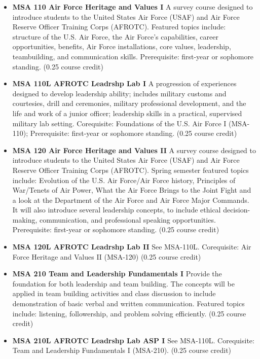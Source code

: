 \documentclass[
  letterpaper,
]{scrbook}
\providecommand{\tightlist}{%
  \setlength{\itemsep}{0pt}\setlength{\parskip}{0pt}}
\begin{document}
\begin{itemize}
\tightlist
\item
  \textbf{MSA 110 Air Force Heritage and Values I} A survey course
  designed to introduce students to the United States Air Force (USAF)
  and Air Force Reserve Officer Training Corps (AFROTC). Featured topics
  include: structure of the U.S. Air Force, the Air Force's
  capabilities, career opportunities, benefits, Air Force installations,
  core values, leadership, teambuilding, and communication skills.
  Prerequisite: first-year or sophomore standing. (0.25 course credit)\\
\item
  \textbf{MSA 110L AFROTC Leadrshp Lab I} A progression of experiences
  designed to develop leadership ability; includes military customs and
  courtesies, drill and ceremonies, military professional development,
  and the life and work of a junior officer; leadership skills in a
  practical, supervised military lab setting. Corequisite: Foundations
  of the U.S. Air Force I (MSA-110); Prerequisite: first-year or
  sophomore standing. (0.25 course credit)
\item
  \textbf{MSA 120 Air Force Heritage and Values II} A survey course
  designed to introduce students to the United States Air Force (USAF)
  and Air Force Reserve Officer Training Corps (AFROTC). Spring semester
  featured topics include: Evolution of the U.S. Air Force/Air Force
  history, Principles of War/Tenets of Air Power, What the Air Force
  Brings to the Joint Fight and a look at the Department of the Air
  Force and Air Force Major Commands. It will also introduce several
  leadership concepts, to include ethical decision-making,
  communication, and professional speaking opportunities. Prerequisite:
  first-year or sophomore standing. (0.25 course credit)
\item
  \textbf{MSA 120L AFROTC Leadrshp Lab II} See MSA-110L. Corequisite:
  Air Force Heritage and Values II (MSA-120) (0.25 course credit)
\item
  \textbf{MSA 210 Team and Leadership Fundamentals I} Provide the
  foundation for both leadership and team building. The concepts will be
  applied in team building activities and class discussion to include
  demonstration of basic verbal and written communication. Featured
  topics include: listening, followership, and problem solving
  efficiently. (0.25 course credit)
\item
  \textbf{MSA 210L AFROTC Leadrshp Lab ASP I} See MSA-110L. Corequisite:
  Team and Leadership Fundamentals I (MSA-210). (0.25 course credit)

\end{itemize}
\end{document}
